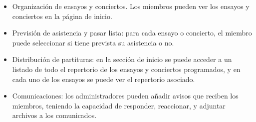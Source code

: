 \begin{itemize}
    \item Organización de ensayos y conciertos. Los miembros pueden ver los ensayos y conciertos en la página de inicio.
    \item Previsión de asistencia y pasar lista: para cada ensayo o concierto, el miembro puede seleccionar si tiene prevista su asistencia o no.
    \item Distribución de partituras: en la sección de inicio se puede acceder a un listado de todo el repertorio de los ensayos y conciertos programados, y en cada uno de los ensayos se puede ver el repertorio asociado.
    \item Comunicaciones: los administradores pueden añadir avisos que reciben los miembros, teniendo la capacidad de responder, reaccionar, y adjuntar archivos a los comunicados.
\end{itemize}

